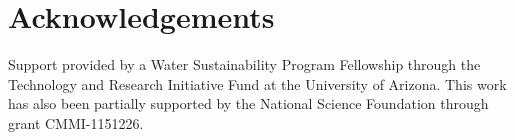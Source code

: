 \documentclass[11pt]{article}
\begin{document}
\section*{Acknowledgements}
Support provided by a Water Sustainability Program Fellowship through the Technology and Research Initiative Fund at the University of Arizona.
This work has also been partially supported by the National Science Foundation through grant CMMI-1151226.


\end{document}
